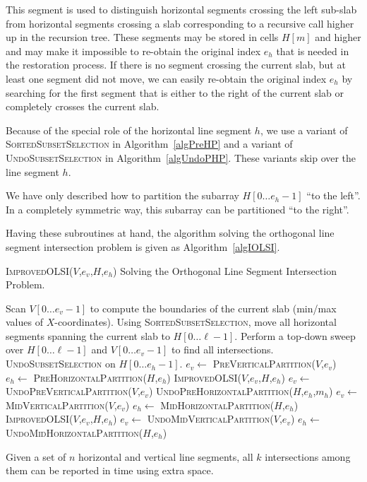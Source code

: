 This segment is used to distinguish horizontal segments crossing the
left sub-slab from horizontal segments crossing a slab corresponding
to a recursive call higher up in the recursion tree. These segments
may be stored in cells ${H}[m]$ and higher and may make it
impossible to re-obtain the original index $e_h$ that is needed in the
restoration process. If there is no segment crossing the current
slab, but at least one segment did not move, we can easily re-obtain
the original index $e_h$ by searching for the first segment that is either
to the right of the current slab or completely crosses the current
slab.

Because of the special role of the horizontal line segment $h$,
we use a variant of \textsc{SortedSubsetSelection} in
Algorithm~\ref{algPreHP} and a variant of \textsc{UndoSubsetSelection}
in Algorithm~\ref{algUndoPHP}. These variants skip over the line 
segment $h$. 

We have only described how to partition the subarray
${H}[0\ldots e_h-1]$ ``to the left''.
In a completely symmetric way, this subarray can be partitioned
``to the right''.

Having these subroutines at hand, the algorithm solving the orthogonal 
line segment intersection problem is given as Algorithm~\ref{algIOLSI}.

\begin{algorithm}

  \caption{\textsc{ImprovedOLSI}(${V}$,$e_v$,${H}$,$e_h$)
  Solving the Orthogonal Line Segment Intersection Problem.} 
   \label{algIOLSI}
  
  \begin{algorithmic}[1]
    \STATE Scan ${V}[0\ldots e_v-1]$ to compute the
    boundaries of the current slab (min/max values of
    $X$-coordinates). 
    \STATE Using \textsc{SortedSubsetSelection}, move all horizontal 
    segments spanning the current slab to ${H}[0\ldots \ell -1]$. 
    \STATE Perform a top-down sweep over ${H}[0\ldots \ell -1]$
    and ${V}[0\ldots e_v-1]$ to find all intersections.
    \STATE \textsc{UndoSubsetSelection} on
    ${H}[0\ldots e_h-1]$.
    \STATE $e_v \leftarrow$ \textsc{PreVerticalPartition}(${V}$,$e_v$)
    \STATE $e_h \leftarrow$ \textsc{PreHorizontalPartition}(${H}$,$e_h$)
    \STATE \textsc{ImprovedOLSI}(${V}$,$e_v$,${H}$,$e_h$)
    \STATE $e_v \leftarrow$ \textsc{UndoPreVerticalPartition}(${V}$,$e_v$)
    \STATE \textsc{UndoPreHorizontalPartition}(${H}$,$e_h$,$m_h$)
    \STATE $e_v \leftarrow$ \textsc{MidVerticalPartition}(${V}$,$e_v$)
    \STATE $e_h \leftarrow$ \textsc{MidHorizontalPartition}(${H}$,$e_h$)
    \STATE
    \textsc{ImprovedOLSI}(${V}$,$e_v$,${H}$,$e_h$)
    \STATE $e_v \leftarrow$ \textsc{UndoMidVerticalPartition}(${V}$,$e_v$)
    \STATE $e_h \leftarrow$ \textsc{UndoMidHorizontalPartition}(${H}$,$e_h$)
  \end{algorithmic}
\end{algorithm}

\begin{theorem}
Given a set of $n$ horizontal and vertical line segments, all $k$ 
intersections among them can be reported in  time 
using  extra space. 
\end{theorem}


